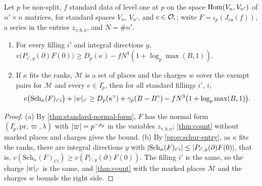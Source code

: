 \begin{theorem}\label{thm:standard-divisibility}
Let $p$ be non-split, $f$ standard data of level one at $p$ on the space $\operatorname{Hom}(V_n,V_{n'})$ of
$n'\times n$ matrices, for standard spaces $V_n$, $V_{n'}$, and $c\in\mathcal{O}_\iota$; write $F=\iota_p(J_{c\mathsf a}(f))$,
a series in the entries $z_{\tau,b,a}$, and $N=\#n'$.
\begin{enumerate}[label=\textup{(\alph*)}]
\item For every filling $i'$ and integral directions $y$,
$v\bigl(P_{i',y}(\partial)F(0)\bigr)\ge D_p(\kappa)-fN^3(1+\log_p\max(B,1))$.
\item If $\kappa$ fits the ranks, $\mathcal M$ is a set of places and the charges $w$ cover the exempt
pairs for $\mathcal M$ and every $e\in I_p^\circ$, then for all standard fillings $i'$, $i$,
\[
  v\bigl(\mathrm{Sch}_\kappa(F)_{i'i}\bigr)+\lvert w\rvert_{i'}\ge D_p(\kappa^\circ)+\gamma_p(B-B^\circ)
  -fN^3\bigl(1+\log_p\max(B,1)\bigr).
\]
\end{enumerate}
\end{theorem}

\begin{proof}
(a) By \cref{thm:standard-normal-form}, $F$ has the normal form $(I_p^\circ,\mathrm{pr},\varpi,\lambda)$ with $\lvert \varpi\rvert=p^{-\rho_p}$ in the variables $z_{\tau,b,a}$; \cref{thm:count} without marked places and charges gives the bound. (b) By \cref{prop:schur-entry}, as $\kappa$ fits the ranks, there are integral directions $y$ with $\lvert \mathrm{Sch}_\kappa(F)_{i'i}\rvert\le\lvert P_{i',y}(\partial)F(0)\rvert$, that is, $v(\mathrm{Sch}_\kappa(F)_{i'i})\ge v(P_{i',y}(\partial)F(0))$. The filling $i'$ is the same, so the charge $\lvert w\rvert_{i'}$ is the same, and \cref{thm:count} with the marked places $\mathcal M$ and the charges $w$ bounds the right side.
\end{proof}
